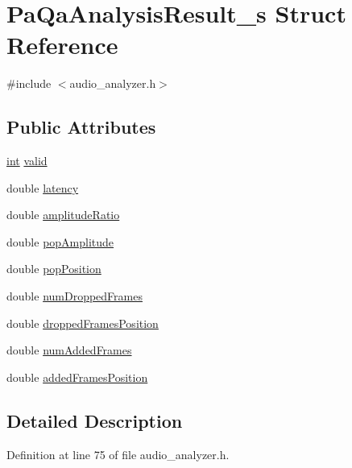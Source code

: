 \hypertarget{struct_pa_qa_analysis_result__s}{}\section{Pa\+Qa\+Analysis\+Result\+\_\+s Struct Reference}
\label{struct_pa_qa_analysis_result__s}


{\ttfamily \#include $<$audio\+\_\+analyzer.\+h$>$}

\subsection*{Public Attributes}
\begin{DoxyCompactItemize}
\item 
\hyperlink{xmltok_8h_a5a0d4a5641ce434f1d23533f2b2e6653}{int} \hyperlink{struct_pa_qa_analysis_result__s_affa94b0959c600449a9473337ddd8abd}{valid}
\item 
double \hyperlink{struct_pa_qa_analysis_result__s_aa01cd3b08f4331d42e541a5525b5a5ef}{latency}
\item 
double \hyperlink{struct_pa_qa_analysis_result__s_a3db306b382cb9b01f4954e078f1f0d4c}{amplitude\+Ratio}
\item 
double \hyperlink{struct_pa_qa_analysis_result__s_ab23ac837dc1cc396ab58326efea278ba}{pop\+Amplitude}
\item 
double \hyperlink{struct_pa_qa_analysis_result__s_aa803a3ce07fc930d172f019881cb5b44}{pop\+Position}
\item 
double \hyperlink{struct_pa_qa_analysis_result__s_adf01d50ef45ca2a38f961659b0b5e39e}{num\+Dropped\+Frames}
\item 
double \hyperlink{struct_pa_qa_analysis_result__s_a5465c8dc21981f08bce260e864882808}{dropped\+Frames\+Position}
\item 
double \hyperlink{struct_pa_qa_analysis_result__s_aeb484763fda64f2ad66d30f1e7538290}{num\+Added\+Frames}
\item 
double \hyperlink{struct_pa_qa_analysis_result__s_a54d571e9c681cdaf3901744c0dd84d10}{added\+Frames\+Position}
\end{DoxyCompactItemize}


\subsection{Detailed Description}


Definition at line 75 of file audio\+\_\+analyzer.\+h.



